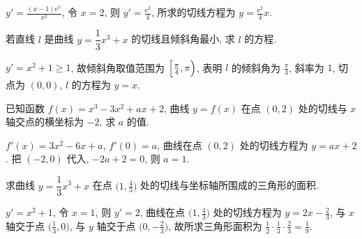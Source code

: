  \beginsolution
    $y'=\frac{(x-1)\mathrm{e}^x}{x^2}$, 令 $x=2$, 则 $y'=\frac{\mathrm{e}^2}4$, 所求的切线方程为 $y=\frac{\mathrm{e}^2}4 x$.
  \endsolution

  \begin{exercise}
    若直线 $l$ 是曲线 $y= \dfrac13 x^3 +x$ 的切线且倾斜角最小, 求 $l$ 的方程.
  \end{exercise}

  \beginsolution
    $y'=x^2+1\geqslant 1$, 故倾斜角取值范围为 $\Bigl[\frac{\pi}4,\pi\Bigr)$, 表明 $l$ 的倾斜角为 $\frac\pi4$, 斜率为 $1$, 切点为 $(0,0)$, $l$ 的方程为 $y=x$.
  \endsolution
  
  \begin{exercise}
    已知函数 $f(x)=x^3 -3x^2 +ax+2$, 曲线 $y=f(x)$ 在点 $(0,2)$ 处的切线与 $x$ 轴交点的横坐标为 $-2$, 求 $a$ 的值.
  \end{exercise}

  \beginsolution
    $f'(x)=3x^2-6x+a$, $f'(0)=a$, 曲线在点 $(0,2)$ 处的切线方程为 $y=ax+2$. 把 $(-2,0)$ 代入, $-2a+2=0$, 则 $a=1$.
  \endsolution
  
  \begin{exercise}
    求曲线 $y=\dfrac13 x^3 +x$ 在点 $\Big(1,\frac43\Big)$ 处的切线与坐标轴所围成的三角形的面积.
  \end{exercise}
  

  \beginsolution
    $y'= x^2+1$, 令 $x=1$, 则 $y'=2$, 曲线在点 $\Big(1,\frac43\Big)$ 处的切线方程为 $y=2x-\frac23$, 与 $x$ 轴交于点 $\Big(\frac13,0\Big)$, 与 $y$ 轴交于点 $\Big(0,-\frac23\Big)$, 故所求三角形面积为 $\frac12\cdot \frac13\cdot \frac23= \frac19$.
  \endsolution


